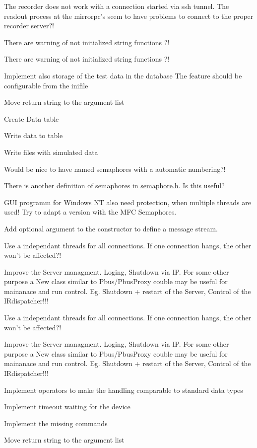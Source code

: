 \begin{DoxyRefList}
The recorder does not work with a connection started via ssh tunnel. The readout process at the mirrorpc's seem to have problems to connect to the proper recorder server?! 
\item[\label{todo__todo000003}%
\hypertarget{todo__todo000003}{}%
Class \hyperlink{classInifile}{Inifile} ]There are warning of not initialized string functions ?!

There are warning of not initialized string functions ?! 
\item[\label{todo__todo000016}%
\hypertarget{todo__todo000016}{}%
Class \hyperlink{classLara}{Lara} ]Implement also storage of the test data in the database The feature should be configurable from the inifile  
\item[\label{todo__todo000017}%
\hypertarget{todo__todo000017}{}%
Class \hyperlink{classMast}{Mast} ]Move return string to the argument list 

Create Data table 

Write data to table 

Write files with simulated data 
\item[\label{todo__todo000004}%
\hypertarget{todo__todo000004}{}%
Class \hyperlink{classsemaphore}{semaphore} ]Would be nice to have named semaphores with a automatic numbering?! 

There is another definition of semaphores in \hyperlink{semaphore_8h}{semaphore.\-h}. Is this useful? 

G\-U\-I programm for Windows N\-T also need protection, when multiple threads are used! Try to adapt a version with the M\-F\-C Semaphores.

Add optional argument to the constructor to define a message stream. 
\item[\label{todo__todo000006}%
\hypertarget{todo__todo000006}{}%
Class \hyperlink{classSimpleServer}{Simple\-Server} ]Use a independant threads for all connections. If one connection hangs, the other won't be affected?! 

Improve the Server managment. Loging, Shutdown via I\-P. For some other purpose a New class similar to Pbus/\-Pbus\-Proxy couble may be useful for mainanace and run control. Eg. Shutdown + restart of the Server, Control of the I\-Rdispatcher!!!

Use a independant threads for all connections. If one connection hangs, the other won't be affected?! 

Improve the Server managment. Loging, Shutdown via I\-P. For some other purpose a New class similar to Pbus/\-Pbus\-Proxy couble may be useful for mainanace and run control. Eg. Shutdown + restart of the Server, Control of the I\-Rdispatcher!!! 
\item[\label{todo__todo000007}%
\hypertarget{todo__todo000007}{}%
Class \hyperlink{classUnsignedInt64}{Unsigned\-Int64} ]Implement operators to make the handling comparable to standard data types  
\item[\label{todo__todo000008}%
\hypertarget{todo__todo000008}{}%
Class \hyperlink{classWGCommand}{W\-G\-Command} ]Implement timeout waiting for the device 

Implement the missing commands 
\item[\label{todo__todo000018}%
\hypertarget{todo__todo000018}{}%
Class \hyperlink{classwolkenkamera}{wolkenkamera} ]Move return string to the argument list
\end{DoxyRefList}